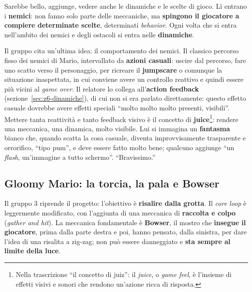 Sarebbe bello, aggiunge, vedere anche le dinamiche e le scelte di gioco. Lì entrano
i \textbf{nemici}: non fanno solo parte delle meccaniche, ma \textbf{spingono il
giocatore a compiere determinate scelte}, determinati \emph{behavior}. Ogni volta che
si entra nell'ambito dei nemici e degli ostacoli si entra nelle \textbf{dinamiche}.

Il gruppo cita un'ultima idea: il comportamento dei nemici. Il classico percorso
fisso dei nemici di Mario, intervallato da \textbf{azioni casuali}: uscire dal
percorso, fare uno scatto verso il personaggio, per ricreare il \textbf{jumpscare} o
comunque la situazione inaspettata, in cui conviene avere un controllo reattivo e
quindi essere più vicini al \emph{game over}. Il relatore lo collega
all'\textbf{action feedback} (sezione~\ref{sec:z6-dinamiche}), di cui non si era
parlato direttamente: questo effetto casuale dovrebbe avere effetti speciali ``molto
molto molto presenti, visibili''. Mettere tanta reattività e tanto feedback visivo è
il concetto di \textbf{juice}\footnote{Nella trascrizione ``il concetto di juiz'':
il \emph{juice}, o \emph{game feel}, è l'insieme di effetti visivi e sonori che
rendono un'azione ricca di risposta.}: rendere una meccanica, una dinamica, molto
visibile. Lui si immagina un \textbf{fantasma} bianco che, quando scatta la cosa
casuale, diventa improvvisamente trasparente e orrorifico, ``tipo pum'', e deve essere
fatto molto bene; qualcuno aggiunge ``un \emph{flash}, un'immagine a tutto schermo''.
``Bravissimo.''

\subsection{Gloomy Mario: la torcia, la pala e Bowser}

Il gruppo 3 riprende il progetto: l'obiettivo è \textbf{risalire dalla grotta}. Il
\emph{core loop} è leggermente modificato, con l'aggiunta di una meccanica di
\textbf{raccolta e colpo} (\emph{gather and hit}). La meccanica fondamentale è
\textbf{Bowser}, il mostro che \textbf{insegue il giocatore}, prima dalla parte
destra e poi, hanno pensato, dalla sinistra, per dare l'idea di una risalita a
zig-zag; non può essere danneggiato e \textbf{sta sempre al limite della luce}.

